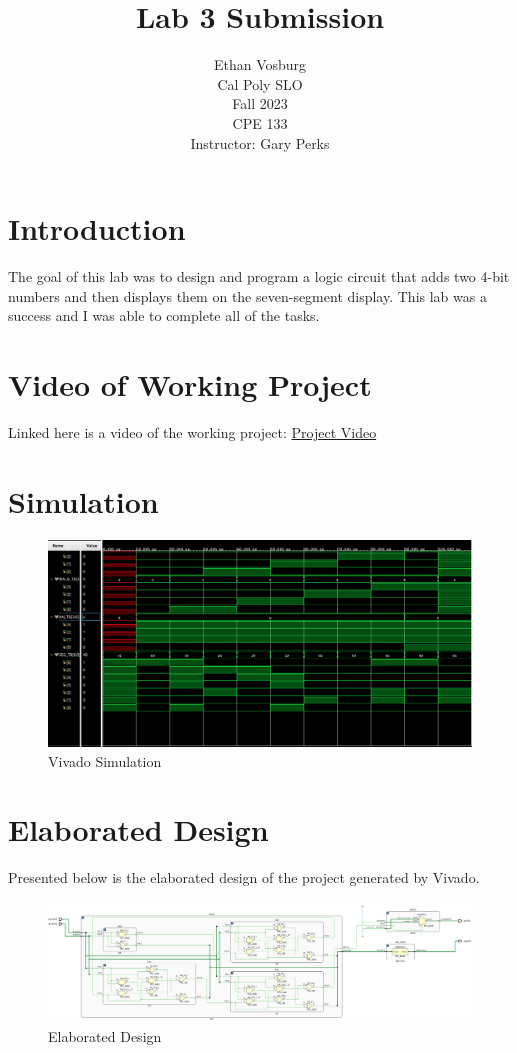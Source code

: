 \documentclass[12pt]{article}
\title{Lab 3 Submission}
\author{Ethan Vosburg\\
    Cal Poly SLO \\
    Fall 2023\\
    CPE 133\\
    Instructor: Gary Perks
}
\begin{document}
\maketitle

\newpage

\section{Introduction}

The goal of this lab was to design and program a logic circuit that adds two 4-bit numbers and then displays them on the seven-segment display. This lab was a success and I was able to complete all of the tasks.

\section{Video of Working Project}

Linked here is a video of the working project: \href{https://youtu.be/RuO1vYSFrW4}{Project Video}

\section{Simulation}

\begin{figure}[h]
    \centering
    \includegraphics[width=.8\textwidth]{Figures/CPE 133 Lab 3 Simulation.png}
    \caption{Vivado Simulation}
    \label{fig:simulation}
\end{figure}

\section{Elaborated Design}

Presented below is the elaborated design of the project generated by Vivado.

\begin{figure}[h]
    \centering
    \includegraphics[width=.95\textwidth]{Figures/CPE 133 Lab 3 Elaboragted Design.png}
    \caption{Elaborated Design}
    \label{fig:elaborateddesign}
\end{figure}
\end{document}
